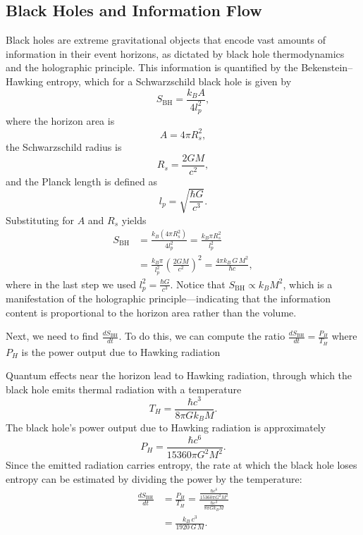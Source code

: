 \documentclass[12pt]{article}
\begin{document}
\subsection{Black Holes and Information Flow}  

Black holes are extreme gravitational objects that encode vast amounts of information in their event horizons, as dictated by black hole thermodynamics and the holographic principle. This information is quantified by the Bekenstein–Hawking entropy, which for a Schwarzschild black hole is given by
\begin{equation}
    S_{\text{BH}} = \frac{k_B A}{4l_p^2},
\end{equation}
where the horizon area is 
\begin{equation}
    A = 4\pi R_s^2,
\end{equation}
the Schwarzschild radius is 
\begin{equation}
    R_s = \frac{2GM}{c^2},
\end{equation}
and the Planck length is defined as 
\begin{equation}
    l_p = \sqrt{\frac{\hbar G}{c^3}}.
\end{equation}
Substituting for \(A\) and \(R_s\) yields
\begin{align}
    S_{\text{BH}} &= \frac{k_B (4\pi R_s^2)}{4l_p^2} 
    = \frac{k_B \pi R_s^2}{l_p^2}  \nonumber \\
    &= \frac{k_B \pi}{l_p^2}\left(\frac{2GM}{c^2}\right)^2 
    = \frac{4\pi k_B\, G\, M^2}{\hbar c},
\end{align}
where in the last step we used \(l_p^2=\frac{\hbar G}{c^3}\). Notice that \(S_{\text{BH}} \propto k_B M^2\), which is a manifestation of the holographic principle—indicating that the information content is proportional to the horizon area rather than the volume.

Next, we need to find $\frac{dS_{\text{BH}}}{dt}$. To do this, we can compute the ratio $\frac{dS_{\text{BH}}}{dt} = \frac{P_H}{T_H}$ where $P_H$ is the power output due to Hawking radiation

Quantum effects near the horizon lead to Hawking radiation, through which the black hole emits thermal radiation with a temperature
\begin{equation}
    T_H = \frac{\hbar c^3}{8\pi G k_B M}.
\end{equation}
The black hole’s power output due to Hawking radiation is approximately
\begin{equation}
    P_H = \frac{\hbar c^6}{15360\pi G^2 M^2}.
\end{equation}
Since the emitted radiation carries entropy, the rate at which the black hole loses entropy can be estimated by dividing the power by the temperature:
\begin{align}
    \frac{dS_{\text{BH}}}{dt} &= \frac{P_H}{T_H} 
    = \frac{\frac{\hbar c^6}{15360\pi G^2 M^2}}{\frac{\hbar c^3}{8\pi G k_B M}} \nonumber \\
    &= \frac{k_B\, c^3}{1920\, G\, M}.
\end{align}
\end{document}

